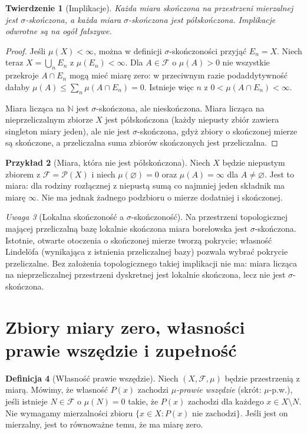 \documentclass[11pt,a4paper,oneside]{book}
\numberwithin{equation}{chapter}
\theoremstyle{plain}
\newtheorem{twierdzenie}{Twierdzenie}[chapter]
\theoremstyle{definition}
\newtheorem{definicja}[twierdzenie]{Definicja}
\newtheorem{przyklad}[twierdzenie]{Przykład}
\theoremstyle{remark}
\newtheorem{uwaga}[twierdzenie]{Uwaga}
\begin{document}
\begin{twierdzenie}[Implikacje]
\label{thm:finiteness-implications}
Każda miara skończona na przestrzeni mierzalnej jest
$\sigma$-skończona, a każda miara $\sigma$-skończona
jest półskończona. Implikacje odwrotne są na ogół fałszywe.
\end{twierdzenie}
\begin{proof}
Jeśli $\mu(X)<\infty$, można w definicji $\sigma$-skończoności
przyjąć $E_n=X$. Niech teraz $X=\bigcup_nE_n$ z
$\mu(E_n)<\infty$. Dla $A\in\mathcal F$ o $\mu(A)>0$
nie wszystkie przekroje $A\cap E_n$ mogą mieć miarę zero:
w przeciwnym razie podaddytywność dałaby
$\mu(A)\leq\sum_n\mu(A\cap E_n)=0$.
Istnieje więc $n$ z $0<\mu(A\cap E_n)<\infty$.

Miara licząca na $\mathbb N$ jest $\sigma$-skończona,
ale nieskończona. Miara licząca na nieprzeliczalnym
zbiorze $X$ jest półskończona (każdy niepusty zbiór
zawiera singleton miary jeden), ale nie jest
$\sigma$-skończona, gdyż zbiory o skończonej mierze
są skończone, a przeliczalna suma zbiorów skończonych
jest przeliczalna.
\end{proof}

\begin{przyklad}[Miara, która nie jest półskończona]
Niech $X$ będzie niepustym zbiorem z $\mathcal F=\mathcal P(X)$
i niech $\mu(\varnothing)=0$ oraz $\mu(A)=\infty$
dla $A\ne\varnothing$. Jest to miara: dla rodziny
rozłącznej z niepustą sumą co najmniej jeden składnik
ma miarę $\infty$. Nie ma jednak żadnego podzbioru
o mierze dodatniej i skończonej.
\end{przyklad}

\begin{uwaga}[Lokalna skończoność a $\sigma$-skończoność]
Na przestrzeni topologicznej mającej przeliczalną bazę
lokalnie skończona miara borelowska jest $\sigma$-skończona.
Istotnie, otwarte otoczenia o skończonej mierze tworzą
pokrycie; własność Lindelöfa (wynikająca z istnienia
przeliczalnej bazy) pozwala wybrać pokrycie przeliczalne.
Bez założenia topologicznego takiej implikacji nie ma:
miara licząca na nieprzeliczalnej przestrzeni dyskretnej
jest lokalnie skończona, lecz nie jest $\sigma$-skończona.
\end{uwaga}

\section{Zbiory miary zero, własności prawie wszędzie i zupełność}

\begin{definicja}[Własność prawie wszędzie]
\label{def:almost-everywhere}
Niech $(X,\mathcal F,\mu)$ będzie przestrzenią z miarą.
Mówimy, że własność $P(x)$ zachodzi \emph{$\mu$-prawie wszędzie}
(skrót: $\mu$-p.w.), jeśli istnieje $N\in\mathcal F$
o $\mu(N)=0$ takie, że $P(x)$ zachodzi dla każdego
$x\in X\setminus N$. Nie wymagamy mierzalności zbioru
$\{x\in X:P(x)\text{ nie zachodzi}\}$.
Jeśli jest on mierzalny, jest to równoważne temu,
że ma miarę zero.
\end{definicja}
\end{document}
